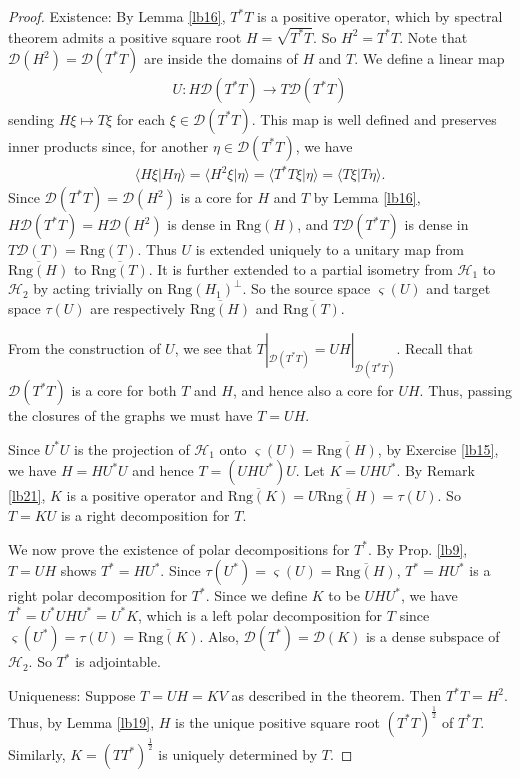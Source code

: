 \documentclass[12pt,b5paper,notitlepage]{article}
\theoremstyle{definition}
\theoremstyle{plain}
\newcommand{\mc}{\mathcal}
\newcommand{\ovl}{\overline}
\newcommand{\Dom}{\scr D}
\newcommand{\bk}[1]{\langle {#1}\rangle}
\newcommand{\scr}{\mathscr}
\newcommand{\sgm}{\varsigma}
\newcommand{\Rng}{\mathrm{Rng}}
\numberwithin{equation}{section}
\begin{document}
\begin{proof}
Existence: By Lemma \ref{lb16}, $T^*T$ is a positive operator,  which by spectral theorem admits a positive square root $H=\sqrt{T^*T}$. So $H^2=T^*T$. Note that $\Dom(H^2)=\Dom(T^*T)$ are inside the domains of $H$ and $T$. We define a linear map
\begin{align*}
U:H\Dom(T^*T)\rightarrow T\Dom(T^*T)	
\end{align*}
sending $H\xi\mapsto T\xi$ for each $\xi\in\Dom(T^*T)$. This map is well defined and preserves inner products since, for another $\eta\in\Dom(T^*T)$, we have
\begin{align*}
\bk{H\xi|H\eta}=\bk{H^2\xi|\eta}=\bk{T^*T\xi|\eta}=\bk{T\xi|T\eta}.	
\end{align*}
Since $\Dom(T^*T)=\Dom(H^2)$ is a core for $H$ and $T$ by Lemma \ref{lb16}, $H\Dom(T^*T)=H\Dom(H^2)$ is dense in $\Rng(H)$, and $T\Dom(T^*T)$ is dense in $T\Dom(T)=\Rng(T)$. Thus $U$ is extended uniquely to a unitary map from $\ovl{\Rng(H)}$ to $\ovl{\Rng(T)}$.	It is further extended to a partial isometry from $\mc H_1$ to $\mc H_2$ by acting trivially on $\Rng(H_1)^\perp$. So the source space $\sgm(U)$ and target space $\tau(U)$ are respectively $\ovl{\Rng(H)}$ and $\ovl{\Rng(T)}$.

From  the construction of $U$, we see that $T|_{\Dom(T^*T)}=UH|_{\Dom(T^*T)}$. Recall that $\Dom(T^*T)$ is a core for both $T$ and $H$, and hence also a core for $UH$. Thus, passing the closures of the graphs we must have $T=UH$.

Since $U^*U$ is the projection of $\mc H_1$ onto $\sgm(U)=\ovl{\Rng(H)}$, by Exercise \ref{lb15}, we have $H=HU^*U$ and hence $T=(UHU^*)U$. Let $K=UHU^*$. By Remark \ref{lb21}, $K$ is a positive operator and $\ovl{\Rng(K)}=U\ovl{\Rng(H)}=\tau(U)$. So $T=KU$ is a right decomposition for $T$.

We now prove the existence of polar decompositions for $T^*$. By Prop. \ref{lb9}, $T=UH$ shows $T^*=HU^*$. Since $\tau(U^*)=\sgm(U)=\ovl{\Rng(H)}$, $T^*=HU^*$ is a right polar decomposition for $T^*$. Since we define $K$ to be $UHU^*$, we have $T^*=U^*UHU^*=U^*K$, which is a left polar decomposition for $T$ since $\sgm(U^*)=\tau(U)=\ovl{\Rng(K)}$. Also, $\Dom(T^*)=\Dom(K)$ is a dense subspace of $\mc H_2$. So $T^*$ is adjointable.

 
	
Uniqueness: Suppose $T=UH=KV$ as described in the theorem. Then $T^*T=H^2$. Thus, by Lemma \ref{lb19}, $H$ is the unique positive square root $(T^*T)^{\frac 12}$ of $T^*T$. Similarly, $K=(TT^*)^{\frac 12}$ is uniquely determined by $T$.


\end{proof}
\end{document}
